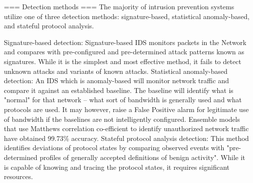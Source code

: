 === Detection methods ===
The majority of intrusion prevention systems utilize one of three detection methods: signature-based, statistical anomaly-based, and stateful protocol analysis.

Signature-based detection: Signature-based IDS monitors packets in the Network and compares with pre-configured and pre-determined attack patterns known as signatures. While it is the simplest and most effective method, it fails to detect unknown attacks and variants of known attacks.
Statistical anomaly-based detection: An IDS which is anomaly-based will monitor network traffic and compare it against an established baseline. The baseline will identify what is "normal" for that network – what sort of bandwidth is generally used and what protocols are used. It may however, raise a False Positive alarm for legitimate use of bandwidth if the baselines are not intelligently configured. Ensemble models that use Matthews correlation co-efficient to identify unauthorized network traffic have obtained 99.73\% accuracy.
Stateful protocol analysis detection: This method identifies deviations of protocol states by comparing observed events with "pre-determined profiles of generally accepted definitions of benign activity". While it is capable of knowing and tracing the protocol states, it requires significant resources.
